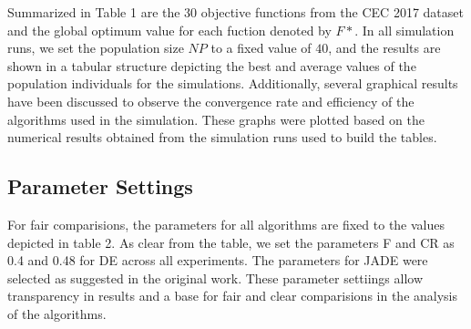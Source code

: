 Summarized in Table 1 are the 30 objective functions from the CEC 2017 dataset and the global optimum value for each fuction denoted by $F*$. In all simulation runs, we set the population size $NP$ to a fixed value of $40$, and the results are shown in a tabular structure depicting the best and average values of the population individuals for the simulations. Additionally, several graphical results have been discussed to observe the convergence rate and efficiency of the algorithms used in the simulation. These graphs were plotted based on the numerical results obtained from the simulation runs used to build the tables.

\subsection{Parameter Settings}


For fair comparisions, the parameters for all algorithms are fixed to the values depicted in table 2. As clear from the table, we set the parameters F and CR as 0.4 and 0.48 for DE across all experiments. The parameters for JADE were selected as suggested in the original work. These parameter settiings allow transparency in results and a base for fair and clear comparisions in the analysis of the algorithms.




